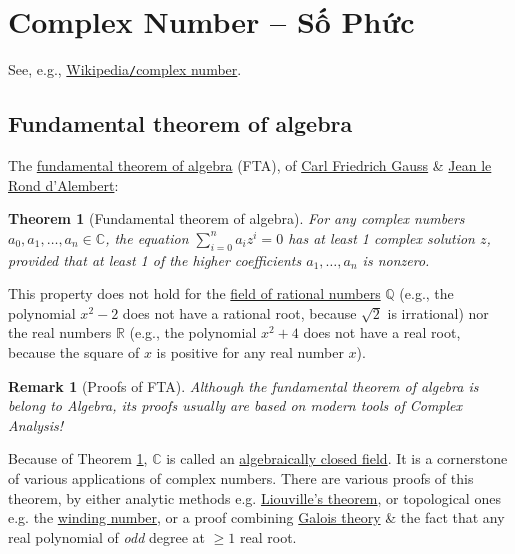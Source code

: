 \documentclass{article}
\newtheorem{remark}{Remark}
\newtheorem{theorem}{Theorem}
\begin{document}

\section{Complex Number -- Số Phức}
See, e.g., \href{https://en.wikipedia.org/wiki/Complex_number}{Wikipedia{\tt/}complex number}.

\subsection{Fundamental theorem of algebra}
The \href{https://en.wikipedia.org/wiki/Fundamental_theorem_of_algebra}{fundamental theorem of algebra} (FTA), of \href{https://en.wikipedia.org/wiki/Carl_Friedrich_Gauss}{\sc Carl Friedrich Gauss} \& \href{https://en.wikipedia.org/wiki/Jean_le_Rond_d%27Alembert}{Jean le Rond d'Alembert}:

\begin{theorem}[Fundamental theorem of algebra]
	\label{thm: FTA}
	For any complex numbers $a_0,a_1,\ldots,a_n\in\mathbb{C}$, the equation $\sum_{i=0}^n a_iz^i = 0$ has at least 1 complex solution $z$, provided that at least 1 of the higher coefficients $a_1,\ldots,a_n$ is nonzero.
\end{theorem}
This property does not hold for the \href{https://en.wikipedia.org/wiki/Rational_number}{field of rational numbers} $\mathbb{Q}$ (e.g., the polynomial $x^2 - 2$ does not have a rational root, because $\sqrt{2}$ is irrational) nor the real numbers $\mathbb{R}$ (e.g., the polynomial $x^2 + 4$ does not have a real root, because the square of $x$ is positive for any real number $x$).

\begin{remark}[Proofs of FTA]
	Although the fundamental theorem of algebra is belong to Algebra, its proofs usually are based on modern tools of Complex Analysis!
\end{remark}
Because of Theorem \ref{thm: FTA}, $\mathbb{C}$ is called an \href{https://en.wikipedia.org/wiki/Algebraically_closed_field}{algebraically closed field}. It is a cornerstone of various applications of complex numbers. There are various proofs of this theorem, by either analytic methods e.g. \href{https://en.wikipedia.org/wiki/Liouville%27s_theorem_(complex_analysis)}{Liouville's theorem}, or topological ones e.g. the \href{https://en.wikipedia.org/wiki/Winding_number}{winding number}, or a proof combining \href{https://en.wikipedia.org/wiki/Galois_theory}{Galois theory} \& the fact that any real polynomial of {\it odd} degree at $\ge1$ real root.
\end{document}
